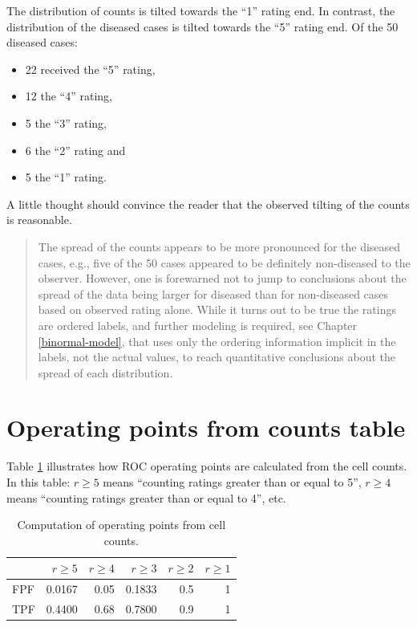 \documentclass[
]{book}
\providecommand{\tightlist}{%
  \setlength{\itemsep}{0pt}\setlength{\parskip}{0pt}}
\begin{document}
The distribution of counts is tilted towards the ``1'' rating end. In contrast, the distribution of the diseased cases is tilted towards the ``5'' rating end. Of the 50 diseased cases:

\begin{itemize}
\tightlist
\item
  22 received the ``5'' rating,
\item
  12 the ``4'' rating,
\item
  5 the ``3'' rating,
\item
  6 the ``2'' rating and
\item
  5 the ``1'' rating.
\end{itemize}

A little thought should convince the reader that the observed tilting of the counts is reasonable.

\begin{quote}
The spread of the counts appears to be more pronounced for the diseased cases, e.g., five of the 50 cases appeared to be definitely non-diseased to the observer. However, one is forewarned not to jump to conclusions about the spread of the data being larger for diseased than for non-diseased cases based on observed rating alone. While it turns out to be true the ratings are ordered labels, and further modeling is required, see Chapter \ref{binormal-model}, that uses only the ordering information implicit in the labels, not the actual values, to reach quantitative conclusions about the spread of each distribution.
\end{quote}

\hypertarget{ratings-task-operating-points-from-counts-table}{%
\section{Operating points from counts table}\label{ratings-task-operating-points-from-counts-table}}

Table \ref{tab:ratings-paradigm-table-2} illustrates how ROC operating points are calculated from the cell counts. In this table: \(r\geq 5\) means ``counting ratings greater than or equal to 5'', \(r\geq 4\) means ``counting ratings greater than or equal to 4'', etc.

\begin{table}

\caption{\label{tab:ratings-paradigm-table-2}Computation of operating points from cell counts.}
\centering
\begin{tabular}[t]{l|r|r|r|r|r}
\hline
  & $r\geq 5$ & $r\geq 4$ & $r\geq 3$ & $r\geq 2$ & $r\geq 1$\\
\hline
FPF & 0.0167 & 0.05 & 0.1833 & 0.5 & 1\\
\hline
TPF & 0.4400 & 0.68 & 0.7800 & 0.9 & 1\\
\hline
\end{tabular}
\end{table}
\end{document}
